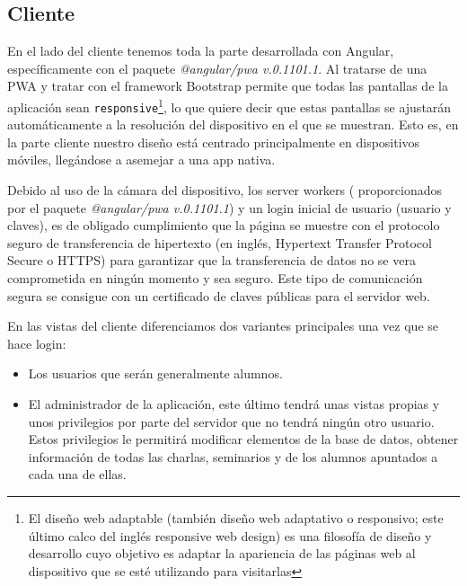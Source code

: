 \documentclass[a4paper, 12pt]{book}
\begin{document}
\subsection{Cliente}
	En el lado del cliente tenemos toda la parte desarrollada con Angular, específicamente con el paquete \textit{@angular/pwa v.0.1101.1}. Al tratarse de una PWA y tratar con el framework Bootstrap permite que todas las pantallas de la aplicación sean \texttt{responsive}\footnote{El diseño web adaptable (también diseño web adaptativo o responsivo; este último calco del inglés responsive web design) es una filosofía de diseño y desarrollo cuyo objetivo es adaptar la apariencia de las páginas web al dispositivo que se esté utilizando para visitarlas}, lo que quiere decir que estas pantallas se ajustarán automáticamente a la resolución del dispositivo en el que se muestran. Esto es, en la parte cliente nuestro diseño está centrado principalmente en dispositivos móviles, llegándose a asemejar a una app nativa.
	
	Debido al uso de la cámara del dispositivo, los server workers ( proporcionados por el paquete \textit{@angular/pwa v.0.1101.1}) y un login inicial de usuario (usuario y claves), es de obligado cumplimiento que la página se muestre con el protocolo seguro de transferencia de hipertexto (en inglés, Hypertext Transfer Protocol Secure o HTTPS) para garantizar que la transferencia de datos no se vera comprometida en ningún momento y sea seguro. Este tipo de comunicación segura se consigue con un certificado de claves públicas para el servidor web.
	
	En las vistas del cliente diferenciamos dos variantes principales una vez que se hace login: 
	\begin{itemize}
  \item Los usuarios que serán generalmente alumnos.
  \item El administrador de la aplicación, este último tendrá unas vistas propias y unos privilegios por parte del servidor que no tendrá ningún otro usuario. Estos privilegios le permitirá modificar elementos de la base de datos, obtener información de todas las charlas, seminarios y de los alumnos apuntados a cada una de ellas.
\end{itemize}

	
\end{document}
